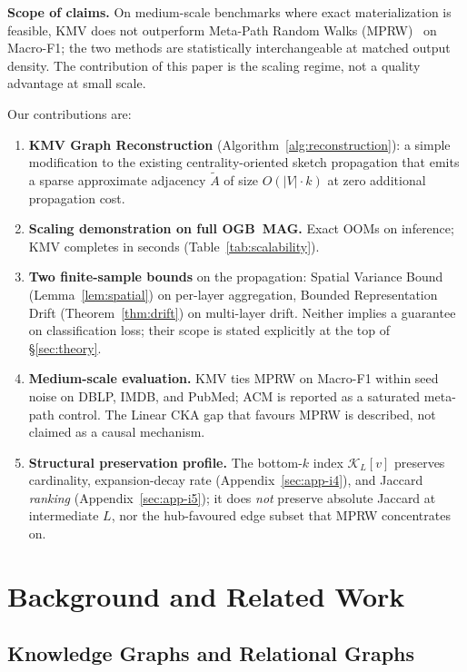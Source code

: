 \documentclass[sigconf]{acmart}
\begin{document}
\textbf{Scope of claims.} On medium-scale benchmarks where exact materialization is feasible, KMV does not outperform Meta-Path Random Walks (MPRW)~\cite{dong2017metapath2vec} on Macro-F1; the two methods are statistically interchangeable at matched output density. The contribution of this paper is the scaling regime, not a quality advantage at small scale.

Our contributions are:
\begin{enumerate}
\item \textbf{KMV Graph Reconstruction} (Algorithm~\ref{alg:reconstruction}): a simple modification to the existing centrality-oriented sketch propagation that emits a sparse approximate adjacency $\widetilde{A}$ of size $O(|V| \cdot k)$ at zero additional propagation cost.
\item \textbf{Scaling demonstration on full OGB~MAG.} Exact OOMs on inference; KMV completes in seconds (Table~\ref{tab:scalability}).
\item \textbf{Two finite-sample bounds} on the propagation: Spatial Variance Bound (Lemma~\ref{lem:spatial}) on per-layer aggregation, Bounded Representation Drift (Theorem~\ref{thm:drift}) on multi-layer drift. Neither implies a guarantee on classification loss; their scope is stated explicitly at the top of \S\ref{sec:theory}.
\item \textbf{Medium-scale evaluation.} KMV ties MPRW on Macro-F1 within seed noise on DBLP, IMDB, and PubMed; ACM is reported as a saturated meta-path control. The Linear CKA gap that favours MPRW is described, not claimed as a causal mechanism.
\item \textbf{Structural preservation profile.} The bottom-$k$ index $\mathcal{K}_L[v]$ preserves cardinality, expansion-decay rate (Appendix~\ref{sec:app-i4}), and Jaccard \emph{ranking} (Appendix~\ref{sec:app-i5}); it does \emph{not} preserve absolute Jaccard at intermediate $L$, nor the hub-favoured edge subset that MPRW concentrates on.
\end{enumerate}

\section{Background and Related Work}
\label{sec:background}

\subsection{Knowledge Graphs and Relational Graphs}
\end{document}
